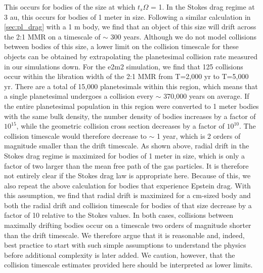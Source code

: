 This occurs for bodies of the size at which $t_{s} \Omega$ = 1. In the Stokes drag regime at 3 au, this occurs for bodies of 1 
meter in size. Following a similar calculation in \ref{sec:pl_drag} with a 1 m body, we find that an object of this size will drift 
across the 2:1 MMR on a timescale of $\sim$ 300 years. Although we do not model collisions between bodies of this size, a 
lower limit on the collision timescale for these objects can be obtained by extrapolating the planetesimal collision rate measured 
in our simulations down. For the e2m2 simulation, we find that 125 collisions occur within the libration width of the 2:1 MMR from 
T=2,000 yr to  T=5,000 yr. There are a total of 15,000 planetesimals within this region, which means that a single planetesimal 
undergoes a collision every $\sim$ 370,000 years on average. If the entire planetesimal population in this region were converted 
to 1 meter bodies with the same bulk density, the number density of bodies increases by a factor of $10^{15}$, while the 
geometric collision cross section decreases by a factor of $10^{10}$. The collision timescale would therefore decrease to $\sim$ 
1 year, which is 2 orders of magnitude smaller than the drift timescale. As shown above, radial drift in the Stokes drag regime is 
maximized for bodies of 1 meter in size, which is only a factor of two larger than the mean free path of the gas particles. It is 
therefore not entirely clear if the Stokes drag law is appropriate here. Because of this, we also repeat the above calculation for 
bodies that experience Epstein drag. With this assumption, we find that radial drift is maximized for a cm-sized body and both 
the radial drift and collision timescale for bodies of that size decrease by a factor of 10 relative to the Stokes values. In both 
cases, collisions between maximally drifting bodies occur on a timescale two orders of magnitude shorter than the drift 
timescale. We therefore argue that it is reasonable and, indeed, best practice to start with such simple assumptions to understand 
the physics before additional complexity is later added. We caution, however, that the collision timescale estimates provided 
here should be interpreted as lower limits.

